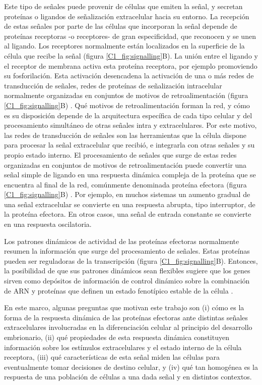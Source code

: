 \documentclass[./main.tex]{subfiles}
\begin{document}
Este tipo de señales puede provenir de células que emiten la señal, y secretan proteínas o ligandos de señalización extracelular hacia su entorno. La recepción de estas señales por parte de las células que incorporan la señal depende de proteínas receptoras -o receptores- de gran especificidad, que reconocen y se unen al ligando. Los receptores normalmente están localizados en la superficie de la célula que recibe la señal (figura \ref{C1_fig:signalling}B). La unión entre el ligando y el receptor de membrana activa esta proteína receptora, por ejemplo promoviendo su fosforilación. Esta activación desencadena la activación de una o más redes de transducción de señales, redes de proteínas de señalización intracelular normalmente organizadas en conjuntos de motivos de retroalimentación (figura \ref{C1_fig:signalling}B) \cite{Alon2006,Shen2002,Milo2002,Tyson2003,Tyson2010,Alon2007}. Qué motivos de retroalimentación forman la red, y cómo es su disposición depende de la arquitectura específica de cada tipo celular y del procesamiento simultáneo de otras señales intra y extracelulares. Por este motivo, las redes de transducción de señales son las herramientas que la célula dispone para procesar la señal extracelular que recibió, e integrarla con otras señales y su propio estado interno. El procesamiento de señales que surge de estas redes organizadas en conjuntos de motivos de retroalimentación puede convertir una señal simple de ligando en una respuesta dinámica compleja de la proteína que se encuentra al final de la red, comúnmente denominada proteína efectora  (figura \ref{C1_fig:signalling}B) \cite{Antebi2017,Santos2007}. Por ejemplo, en muchos sistemas un aumento gradual de una señal extracelular se convierte en una respuesta abrupta, tipo interruptor, de la proteína efectora. En otros casos, una señal de entrada constante se convierte en una respuesta oscilatoria. 


Los patrones dinámicos de actividad de las proteínas efectoras normalmente resumen la información que surge del procesamiento de señales. Estas proteínas pueden ser reguladoras de la transcripción (figura \ref{C1_fig:signalling}B). Entonces, la posibilidad de que sus patrones dinámicos sean flexibles sugiere que los genes sirven como depósitos de información de control dinámico sobre la combinación de ARN y proteínas que definen un estado fenotípico estable de la célula \cite{Koseska2017}.


En este marco, algunas preguntas que motivan este trabajo son (i) cómo es la forma de la respuesta dinámica de las proteínas efectoras ante distintas señales extracelulares involucradas en la diferenciación celular al principio del desarrollo embrionario, (ii) qué propiedades de esta respuesta dinámica constituyen información sobre los estímulos extracelulares y el estado interno de la célula receptora, (iii) qué características de esta señal miden las células para eventualmente tomar decisiones de destino celular, y (iv) qué tan homogénea es la respuesta de una población de células a una dada señal y en distintos contextos. 
\end{document}
